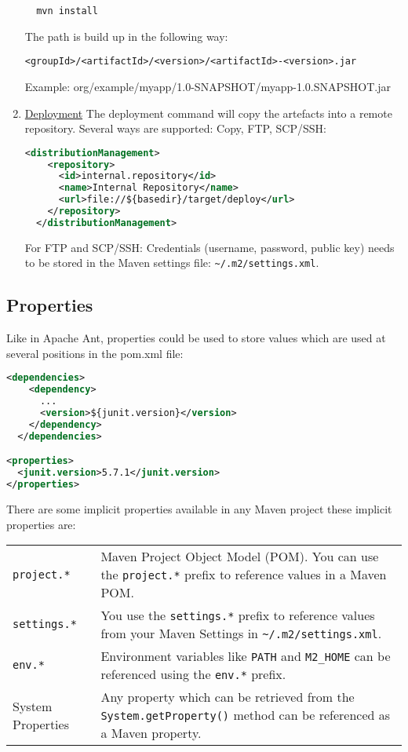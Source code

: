 \begin{enumerate}
\begin{lstlisting}
  mvn install
\end{lstlisting}
The path is build up in the following way:
\begin{verbatim}
<groupId>/<artifactId>/<version>/<artifactId>-<version>.jar
\end{verbatim}
Example: org/example/myapp/1.0-SNAPSHOT/myapp-1.0.SNAPSHOT.jar
%
\newslide
\item \underline{Deployment}
The deployment command will copy the artefacts into a remote
repository. Several ways are supported: Copy, FTP, SCP/SSH:
\begin{lstlisting}[language=xml,
  morekeywords={distributionManagement,repository,id,name,url}]
  <distributionManagement>
    <repository>
      <id>internal.repository</id>
      <name>Internal Repository</name>
      <url>file://${basedir}/target/deploy</url>
    </repository>
  </distributionManagement>
\end{lstlisting}
For FTP and SCP/SSH: Credentials (username, password, public key)
needs to be stored in the Maven settings file: \verb+~/.m2/settings.xml+.
\end{enumerate}
\newslide
\subsection{Properties}
Like in Apache Ant, properties could be used to store values which are
used at several positions in the pom.xml file:
\begin{lstlisting}[language=xml,
 morekeywords={dependencies,dependency,groupId,artifactId,
   version,scope,properties,junit}]
  <dependencies>
    <dependency>
      ...
      <version>${junit.version}</version>
    </dependency>
  </dependencies>

<properties>
  <junit.version>5.7.1</junit.version>
</properties>
\end{lstlisting}
\newslide
There are some implicit properties available in any Maven project
these implicit properties are:

\begin{tabularx}{\linewidth}{lX}
\verb+project.*+ & Maven Project Object Model (POM). You can use the \verb|project.*| prefix to reference values in a Maven POM.\\
\verb+settings.*+ & You use the \verb|settings.*| prefix to reference values from your Maven Settings in \verb|~/.m2/settings.xml|.\\
\verb+env.*+ & Environment variables like \verb|PATH| and \verb|M2_HOME| can be referenced using the \verb|env.*| prefix.\\
System Properties & Any property which can be retrieved from the \verb|System.getProperty()| method can be referenced as a Maven property.\\
\end{tabularx}
\newslide
